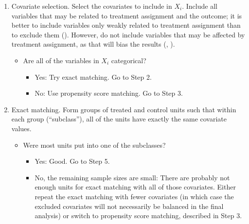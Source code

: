 \documentclass[11pt,titlepage]{article}
\begin{document}
\begin{enumerate}
\item Covariate selection.  Select the covariates to include in $X_i$.  Include all variables that may be related to treatment
assignment and the outcome; it is better to include variables only weakly related to treatment assignment than to exclude them (\cite{RubTho96, Heckman98a}).
However, do not include variables that may be affected by treatment assignment, as that will bias the results (\cite{FraRub02}, \cite{Greenland03}).  
\begin{itemize} \item Are all of the variables in $X_i$ categorical?
	\begin{itemize} \item Yes: Try exact matching.  Go to Step 2.
                        \item No: Use propensity score matching.  Go to Step 3.
        \end{itemize}
\end{itemize}
                                                                                                                                                      
\item  Exact matching.  Form groups of treated and control units such that within each group (``subclass''), all of the units have exactly the same covariate values.  
\begin{itemize} \item Were most units put into one of the subclasses?
        \begin{itemize} \item Yes: Good.  Go to Step 5.
                        \item No, the remaining sample sizes are small: There are probably not
enough units for exact matching with all of those covariates.  Either
repeat the exact matching with fewer covariates (in which case the excluded
covariates will not necessarily be balanced in the final analysis) or
switch to propensity score matching, described in Step 3.
        \end{itemize}
\end{itemize}
                                                                                                                                     

\end{enumerate}
\end{document}
